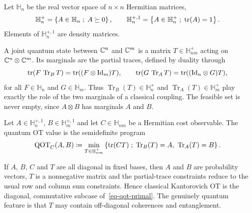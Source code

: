 \begin{defn}\label{def-hermitian-density-matrices}
	Let $\mathbb H_n$ be the real vector space of $n\times n$ Hermitian matrices,
	\[
		\mathbb H_n^+
		=
		\left\{ A\in\mathbb H_n \;;\; A\succeq0 \right\},
		\qquad
		\mathbb H_n^{+,1}
		=
		\left\{ A\in\mathbb H_n^+ \;;\; \operatorname{tr}(A)=1 \right\}.
	\]
	Elements of $\mathbb H_n^{+,1}$ are density matrices.
\end{defn}
A joint quantum state between $\mathbb{C}^n$ and $\mathbb{C}^m$ is a matrix $T\in\mathbb H_{nm}^+$ acting on $\mathbb{C}^n\otimes\mathbb{C}^m$. Its marginals are the partial traces, defined by duality through
\begin{equation}\label{eq-qot-partial-traces}
	\operatorname{tr}(F\,\operatorname{Tr}_B T)=\operatorname{tr}((F\otimes\mathrm{Id}_m)T),
	\qquad
	\operatorname{tr}(G\,\operatorname{Tr}_A T)=\operatorname{tr}((\mathrm{Id}_n\otimes G)T),
\end{equation}
for all $F\in\mathbb H_n$ and $G\in\mathbb H_m$. Thus $\operatorname{Tr}_B(T)\in\mathbb H_n^+$ and $\operatorname{Tr}_A(T)\in\mathbb H_m^+$ play exactly the role of the two marginals of a classical coupling. The feasible set is never empty, since $A\otimes B$ has marginals $A$ and $B$.

\begin{defn}\label{def-finite-dimensional-qot}
	Let $A\in\mathbb H_n^{+,1}$, $B\in\mathbb H_m^{+,1}$ and let $C\in\mathbb H_{nm}$ be a Hermitian cost observable. The quantum OT value is the semidefinite program
	\begin{equation}\label{eq-qot-primal}
		\mathrm{QOT}_C(A,B)
		\eqdef
		\min_{T\in\mathbb H_{nm}^+}
		\enscond{\tr(CT)}{\operatorname{Tr}_B(T)=A,\ \operatorname{Tr}_A(T)=B}.
	\end{equation}
\end{defn}

\begin{example}\label{rem-qot-classical-diagonal-case}
	If $A$, $B$, $C$ and $T$ are all diagonal in fixed bases, then $A$ and $B$ are probability vectors, $T$ is a nonnegative matrix and the partial-trace constraints reduce to the usual row and column sum constraints. Hence classical Kantorovich OT is the diagonal, commutative subcase of~\eqref{eq-qot-primal}. The genuinely quantum feature is that $T$ may contain off-diagonal coherences and entanglement.
\end{example}


